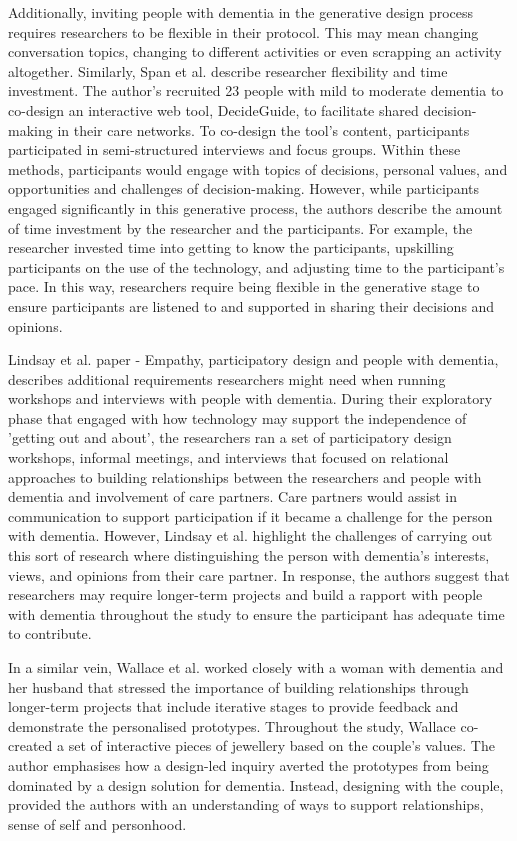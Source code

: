 Additionally, inviting people with dementia in the generative design process requires researchers to be flexible in their protocol. This may mean changing conversation topics, changing to different activities or even scrapping an activity altogether. Similarly, Span et al. describe researcher flexibility and time investment. The author's recruited 23 people with mild to moderate dementia to co-design an interactive web tool, DecideGuide, to facilitate shared decision-making in their care networks. To co-design the tool's content, participants participated in semi-structured interviews and focus groups. Within these methods, participants would engage with topics of decisions, personal values, and opportunities and challenges of decision-making. However, while participants engaged significantly in this generative process, the authors describe the amount of time investment by the researcher and the participants. For example, the researcher invested time into getting to know the participants, upskilling participants on the use of the technology, and adjusting time to the participant's pace. In this way, researchers require being flexible in the generative stage to ensure participants are listened to and supported in sharing their decisions and opinions.

Lindsay et al. paper - Empathy, participatory design and people with dementia, describes additional requirements researchers might need when running workshops and interviews with people with dementia. During their exploratory phase that engaged with how technology may support the independence of 'getting out and about', the researchers ran a set of participatory design workshops, informal meetings, and interviews that focused on relational approaches to building relationships between the researchers and people with dementia and involvement of care partners. Care partners would assist in communication to support participation if it became a challenge for the person with dementia. However, Lindsay et al. highlight the challenges of carrying out this sort of research where distinguishing the person with dementia's interests, views, and opinions from their care partner. In response, the authors suggest that researchers may require longer-term projects and build a rapport with people with dementia throughout the study to ensure the participant has adequate time to contribute.

In a similar vein, Wallace et al. worked closely with a woman with dementia and her husband that stressed the importance of building relationships through longer-term projects that include iterative stages to provide feedback and demonstrate the personalised prototypes. Throughout the study, Wallace co-created a set of interactive pieces of jewellery based on the couple's values. The author emphasises how a design-led inquiry averted the prototypes from being dominated by a design solution for dementia. Instead, designing with the couple, provided the authors with an understanding of ways to support relationships, sense of self and personhood.


